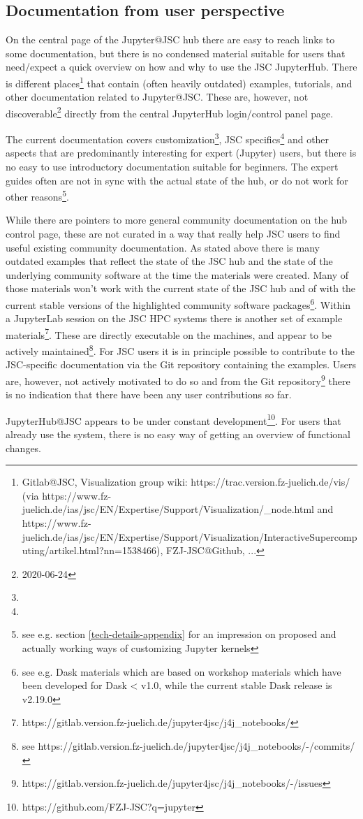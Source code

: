 
\subsection{Documentation from user perspective}
\label{s-doc-from-user-pov}

On the central page of the Jupyter@JSC hub there are easy to reach links to some documentation, but there is no condensed material suitable for users that need/expect a quick overview on how and why to use the JSC JupyterHub.
There is different places\footnote{Gitlab@JSC, Visualization group wiki: https://trac.version.fz-juelich.de/vis/ (via https://www.fz-juelich.de/ias/jsc/EN/Expertise/Support/Visualization/_node.html and https://www.fz-juelich.de/ias/jsc/EN/Expertise/Support/Visualization/InteractiveSupercomputing/artikel.html?nn=1538466), FZJ-JSC@Github, ...} that contain (often heavily outdated) examples, tutorials, and other documentation related to Jupyter@JSC.
These are, however, not discoverable\footnote{2020-06-24} directly from the central JupyterHub login/control panel page.

The current documentation covers customization\footnote{}, JSC specifics\footnote{} and other aspects that are predominantly interesting for expert (Jupyter) users, but there is no easy to use introductory documentation suitable for beginners.
The expert guides often are not in sync with the actual state of the hub, or do not work for other reasons\footnote{see e.g. section \ref{tech-details-appendix} for an impression on proposed and actually working ways of customizing Jupyter kernels}.

While there are pointers to more general community documentation on the hub control page, these are not curated in a way that really help JSC users to find useful existing community documentation.
As stated above there is many outdated examples that reflect the state of the JSC hub and the state of the underlying community software at the time the materials were created.
Many of those materials won't work with the current state of the JSC hub and of with the current stable versions of the highlighted community software packages\footnote{see e.g. Dask materials which are based on workshop materials which have been developed for Dask < v1.0, while the current stable Dask release is v2.19.0}.
Within a JupyterLab session on the JSC HPC systems there is another set of example materials\footnote{https://gitlab.version.fz-juelich.de/jupyter4jsc/j4j_notebooks/}.
These are directly executable on the machines, and appear to be actively maintained\footnote{see https://gitlab.version.fz-juelich.de/jupyter4jsc/j4j_notebooks/-/commits/}.
For JSC users it is in principle possible to contribute to the JSC-specific documentation via the Git repository containing the examples.
Users are, however, not actively motivated to do so and from the Git repository\footnote{https://gitlab.version.fz-juelich.de/jupyter4jsc/j4j_notebooks/-/issues} there is no indication that there have been any user contributions so far.

JupyterHub@JSC appears to be under constant development\footnote{https://github.com/FZJ-JSC?q=jupyter}.
For users that already use the system, there is no easy way of getting an overview of functional changes.
